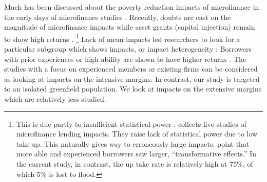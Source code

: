 
	Much has been discussed about the poverty reduction impacts of microfinance in the early days of microfinance studies \citep{Morduch1999}. Recently, doubts are cast on the magnitude of microfinance impacts \citep{BanerjeeKarlanZinman2015, DuvendackMader2019, Meager2019} while asset grants (capital injection) remain to show high returns \citep{deMel2008, DeMel2014, FafchampsFlypaper2014, BandieraBRAC2017}. \footnote{This is due partly to insufficient statistical power \citep{MckenzieWoodruff2013}. \citet{BanerjeeKarlanZinman2015} collects five studies of microfinance lending impacts. They raise lack of statistical power due to low take up. This naturally gives way to erroneously large impacts. \citet{BanerjeeKarlanZinman2015} point that more able and experienced borrowers saw larger, ``transformative effects.'' In the current study, in contrast, the up take rate is relatively high at 75\%, of which 5\% is lost to flood.  } Lack of mean impacts led researchers to look for a particular subgroup which shows impacts, or impact heterogeneity \citep{Banerjee2017HyderabadFollowup}: Borrowers with prior experiences or high ability are shown to have higher returns \citep{Banerjee2015Miracle, Mckenzie2017Spurring, Buera2017}. The studies with a focus on experienced members or existing firms can be considered as looking at impacts on the intensive margins. In contrast, our study is targeted to an isolated greenfield population. We look at impacts on the extensive margins which are relatively less studied.

